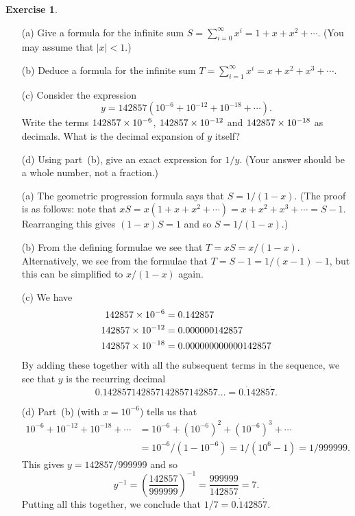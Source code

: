 \documentclass[a4paper]{amsart}
\theoremstyle{definition}
\newtheorem{exercise}{Exercise}[section]
\newenvironment{solution}{{\noindent \bf Solution:}}{}
\begin{document}
\begin{exercise}\label{ex-seventh}
\begin{itemize}
  \item[(a)] Give a formula for the infinite sum
   $S=\sum_{i=0}^\infty x^i=1+x+x^2+\dotsb$.  (You may assume that
   $|x|<1$.) 
  \item[(b)] Deduce a formula for the infinite sum
   $T=\sum_{i=1}^\infty x^i=x+x^2+x^3+\dotsb$.
  \item[(c)] Consider the expression
   \[ y = 142857 (10^{-6} + 10^{-12} + 10^{-18} + \dotsb). \]
   Write the terms $142857\times 10^{-6}$, $142857\times 10^{-12}$ and 
   $142857\times 10^{-18}$ as decimals.  What is the decimal expansion of
   $y$ itself?
  \item[(d)] Using part~(b), give an exact expression for $1/y$.
   (Your answer should be a whole number, not a fraction.)
 \end{itemize}
\end{exercise}

\begin{solution}
\begin{itemize}
  \item[(a)] The geometric progression formula says that 
   $S=1/(1-x)$.  (The proof is as follows: note that
   $xS=x(1+x+x^2+\dotsb)=x+x^2+x^3+\dotsb=S-1$.  Rearranging this gives
   $(1-x)S=1$ and so $S=1/(1-x)$.)
  \item[(b)] From the defining formulae we see that $T=xS=x/(1-x)$.
   Alternatively, we see from the formulae that $T=S-1=1/(x-1)-1$, but
   this can be simplified to $x/(1-x)$ again.
  \item[(c)]
   We have
   \begin{align*}
    142857 \times 10^{-6}  &= 0.142857 \\
    142857 \times 10^{-12} &= 0.000000142857 \\
    142857 \times 10^{-18} &= 0.000000000000142857
   \end{align*}
   By adding these together with all the subsequent terms in the
   sequence, we see that $y$ is the recurring decimal
   \[ 0.142857142857142857142857\ldots = 0.\dot{1}4285\dot{7}. \] 
  \item[(d)] Part~(b) (with $x=10^{-6}$) tells us that
   \begin{align*}
    10^{-6} + 10^{-12} + 10^{-18} + \dotsb 
     &= 10^{-6} + (10^{-6})^2 + (10^{-6})^3 + \dotsb \\
     &= 10^{-6}/(1-10^{-6}) = 1/(10^6-1) = 1/999999.
   \end{align*}
   This gives $y=142857/999999$ and so
   \[ y^{-1} = \left(\frac{142857}{999999}\right)^{-1}
        = \frac{999999}{142857} = 7.
   \]
   Putting all this together, we conclude that
   $1/7=0.\dot{1}4285\dot{7}$. 
 \end{itemize}
\end{solution}
\end{document}
